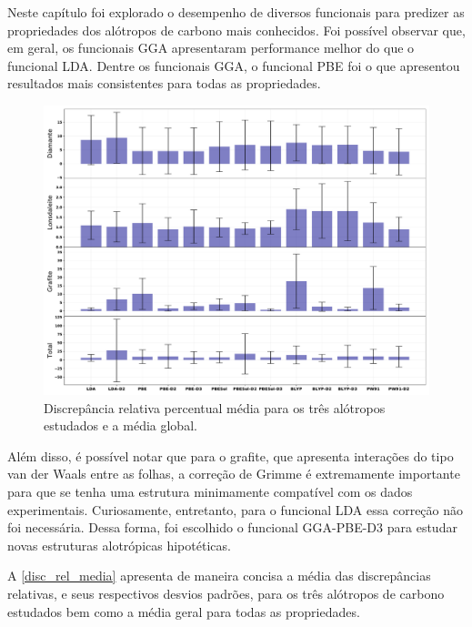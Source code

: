 		Neste capítulo foi explorado o desempenho de diversos funcionais para predizer as propriedades dos alótropos de carbono mais conhecidos. Foi possível observar que, em geral, os funcionais GGA apresentaram performance melhor do que o funcional LDA. Dentre os funcionais GGA, o funcional PBE foi o que apresentou resultados mais consistentes para todas as propriedades. 
		
		\begin{figure}[!h]
			\centering
			\includegraphics[width=1\linewidth]{capitulos/fig/results0/disc_rel_media}
			\caption{Discrepância relativa percentual média para os três alótropos estudados e a média global.}
			\label{disc_rel_media}
		\end{figure}
		
		Além disso, é possível notar que para o grafite, que apresenta interações do tipo van der Waals entre as folhas, a correção de Grimme é extremamente importante para que se tenha uma estrutura minimamente compatível com os dados experimentais. Curiosamente, entretanto, para o funcional LDA essa correção não foi necessária. Dessa forma, foi escolhido o funcional GGA-PBE-D3 para estudar novas estruturas alotrópicas hipotéticas. 
		
		A \autoref{disc_rel_media} apresenta de maneira concisa a média das discrepâncias relativas, e seus respectivos desvios padrões, para os três alótropos de carbono estudados bem como a média geral para todas as propriedades. 
	
		
	
		
